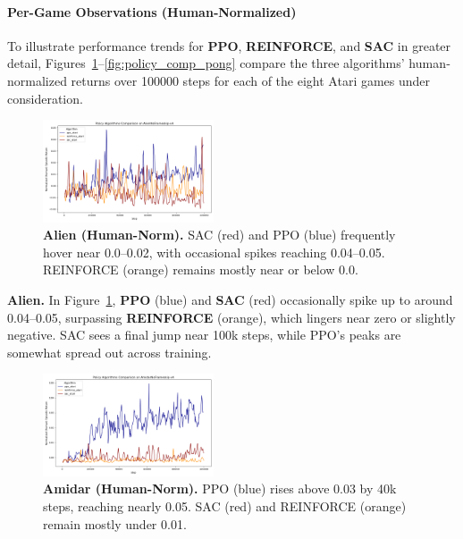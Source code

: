 
\paragraph{Per-Game Observations (Human‐Normalized)}
To illustrate performance trends for \textbf{PPO}, \textbf{REINFORCE}, and \textbf{SAC} in greater detail, Figures~\ref{fig:policy_comp_alien}--\ref{fig:policy_comp_pong} compare the three algorithms’ human‐normalized returns over \num{100000} steps for each of the eight Atari games under consideration.

\begin{figure}[htbp]
	\centering
	\includegraphics[width=0.45\textwidth]{figures/policy_comparison/charts_episodic_return_human_comparison_AlienNoFrameskip-v4_policy.png}
	\caption{\textbf{Alien (Human-Norm).} SAC (red) and PPO (blue) frequently hover near 0.0--0.02, with occasional spikes reaching 0.04--0.05. REINFORCE (orange) remains mostly near or below 0.0.}
	\label{fig:policy_comp_alien}
\end{figure}

\noindent
\textbf{Alien.} In Figure~\ref{fig:policy_comp_alien}, \textbf{PPO} (blue) and \textbf{SAC} (red) occasionally spike up to around 0.04--0.05, surpassing \textbf{REINFORCE} (orange), which lingers near zero or slightly negative. SAC sees a final jump near 100k steps, while PPO’s peaks are somewhat spread out across training.

\begin{figure}[htbp]
	\centering
	\includegraphics[width=0.45\textwidth]{figures/policy_comparison/charts_episodic_return_human_comparison_AmidarNoFrameskip-v4_policy.png}
	\caption{\textbf{Amidar (Human-Norm).} PPO (blue) rises above 0.03 by 40k steps, reaching nearly 0.05. SAC (red) and REINFORCE (orange) remain mostly under 0.01.}
	\label{fig:policy_comp_amidar}
\end{figure}


